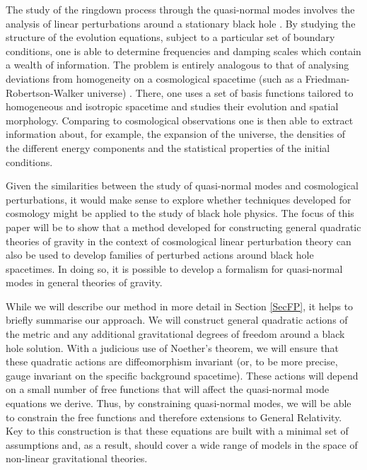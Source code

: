 \documentclass[10pt,twocolumn,preprintnumbers,amsmath,amssymb,nofootinbib
,superscriptaddress]{revtex4-1}
\begin{document}
The study of the ringdown process through the quasi-normal modes involves the analysis of linear perturbations around a stationary black hole \cite{Berti:2009kk}. By studying the structure of the evolution equations, subject to a particular set of boundary conditions, one is able to determine frequencies and damping scales which contain a wealth of information. The problem is entirely analogous to that of analysing deviations from homogeneity on a cosmological spacetime (such as a Friedman-Robertson-Walker universe) 
\cite{Dodelson:2003ft}. There, one uses a set of basis functions tailored to homogeneous and isotropic spacetime and studies their evolution and spatial morphology. Comparing to cosmological observations one is then able to extract information about, for example, the expansion of the universe, the densities of the different energy components and the statistical properties of the initial conditions. 

Given the similarities between the study of quasi-normal modes and cosmological perturbations, it would make sense to explore whether techniques developed for cosmology might be applied to the study of black hole physics. The focus of this paper will be to show that a method developed for constructing general quadratic theories of gravity in the context of cosmological linear perturbation theory \cite{Lagos:2016wyv,2017JCAP...01..047L} can also be used to develop families of perturbed actions around black hole spacetimes. In doing so, it is possible to develop a formalism for quasi-normal modes in general theories of gravity.

While we will describe our method in more detail in Section \ref{SecFP}, it helps to briefly summarise our approach. We will construct general quadratic actions of the metric and any additional gravitational degrees of freedom around a black hole solution. With a judicious use of Noether's theorem, we will ensure that these quadratic actions are diffeomorphism invariant (or, to be more precise, gauge invariant on the specific background spacetime). These actions will depend on a small number of free functions that will affect the quasi-normal mode equations we derive. Thus, by constraining quasi-normal modes, we will be able to constrain the free functions and therefore extensions to General Relativity. Key to this construction is that these equations are built with a minimal set of assumptions and, as a result, should cover a wide range of models in the space of non-linear gravitational theories.
\end{document}
